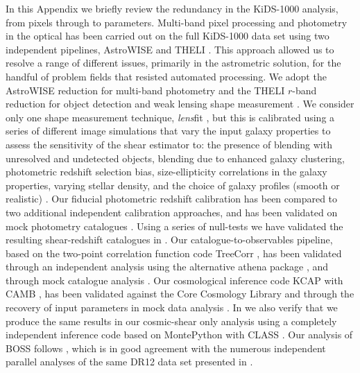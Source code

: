 \begin{appendix}
In this Appendix we briefly review the redundancy in the KiDS-1000 analysis, from pixels through to parameters.   Multi-band pixel processing and photometry in the optical has been carried out on the full KiDS-1000 data set using two independent pipelines, {\sc AstroWISE} and {\sc THELI} \citep{begeman/etal:2013, erben/etal:2013}.  This approach allowed us to resolve a range of different issues, primarily in the astrometric solution, for the handful of problem fields that resisted automated processing.  We adopt the {\sc AstroWISE} reduction for multi-band photometry and the {\sc THELI} $r$-band reduction for object detection and weak lensing shape measurement \citep{kuijken/etal:2019}.  We consider only one shape measurement technique, {\it lens}fit \citep{miller/etal:2013}, but this is calibrated using a series of different image simulations that vary the input galaxy properties to assess the sensitivity of the shear estimator to: the presence of blending with unresolved and undetected objects, blending due to enhanced galaxy clustering, photometric redshift selection bias, size-ellipticity correlations in the galaxy properties,  varying stellar density, and the choice of galaxy profiles (smooth or realistic) \citep[see][for details]{kannawadi/etal:2019, giblin/etal:inprep}.  Our fiducial photometric redshift calibration has been compared to two additional independent calibration approaches, and has been validated on mock photometry catalogues \citep[see][for details]{wright/etal:2020, vandenbusch/etal:2020, hildebrandt/etal:inprep}.   Using a series of null-tests we have validated the resulting shear-redshift catalogues in \citet{giblin/etal:inprep}.    Our catalogue-to-observables pipeline, based on the two-point correlation function code {\sc TreeCorr} \citep{treecorr}, has been validated through an independent analysis using the alternative {\sc athena} package \citep{athena}, and through mock catalogue analysis \citep{joachimi/etal:inprep}.   Our cosmological inference code {\sc KCAP} with {\sc CAMB} \citep{lewis/etal:2000}, has been validated against the Core Cosmology Library \citep[CCL,][]{chisari/etal:2019} and through the recovery of input parameters in mock data analysis \citep{joachimi/etal:inprep}.  In \citet{asgari/etal:inprep} we also verify that we produce the same results in our cosmic-shear only analysis using a completely independent inference code based on {\sc MontePython} with {\sc CLASS} \citep{class, montepython, kohlinger/etal:2019,hildebrandt/etal:2020}.   Our analysis of BOSS follows \citet{sanchez/etal:2017}, which is in good agreement with the numerous independent parallel analyses of the same DR12 data set presented in \citet{alam/etal:2017}.


\end{appendix}

